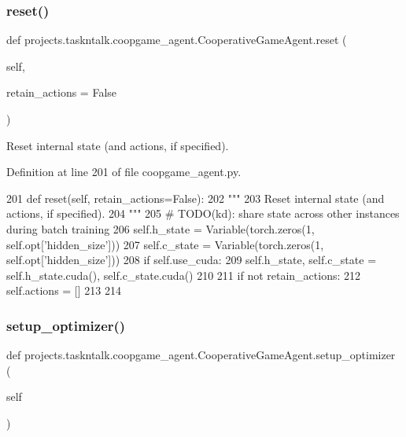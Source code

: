 \subsubsection{\texorpdfstring{reset()}{reset()}}
{\footnotesize\ttfamily def projects.\+taskntalk.\+coopgame\+\_\+agent.\+Cooperative\+Game\+Agent.\+reset (\begin{DoxyParamCaption}\item[{}]{self,  }\item[{}]{retain\+\_\+actions = {\ttfamily False} }\end{DoxyParamCaption})}

\begin{DoxyVerb}Reset internal state (and actions, if specified).
\end{DoxyVerb}
 

Definition at line 201 of file coopgame\+\_\+agent.\+py.


\begin{DoxyCode}
201     \textcolor{keyword}{def }reset(self, retain\_actions=False):
202         \textcolor{stringliteral}{"""}
203 \textcolor{stringliteral}{        Reset internal state (and actions, if specified).}
204 \textcolor{stringliteral}{        """}
205         \textcolor{comment}{# TODO(kd): share state across other instances during batch training}
206         self.h\_state = Variable(torch.zeros(1, self.opt[\textcolor{stringliteral}{'hidden\_size'}]))
207         self.c\_state = Variable(torch.zeros(1, self.opt[\textcolor{stringliteral}{'hidden\_size'}]))
208         \textcolor{keywordflow}{if} self.use\_cuda:
209             self.h\_state, self.c\_state = self.h\_state.cuda(), self.c\_state.cuda()
210 
211         \textcolor{keywordflow}{if} \textcolor{keywordflow}{not} retain\_actions:
212             self.actions = []
213 
214 
\end{DoxyCode}
\mbox{\label{classprojects_1_1taskntalk_1_1coopgame__agent_1_1CooperativeGameAgent_adbd6d539317548bc9fe5e4ceccbe89e0}} 
\subsubsection{\texorpdfstring{setup\+\_\+optimizer()}{setup\_optimizer()}}
{\footnotesize\ttfamily def projects.\+taskntalk.\+coopgame\+\_\+agent.\+Cooperative\+Game\+Agent.\+setup\+\_\+optimizer (\begin{DoxyParamCaption}\item[{}]{self }\end{DoxyParamCaption})}

